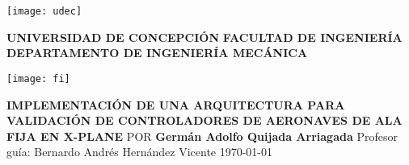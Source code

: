 \begin{titlepage}
    \parbox{1.5cm}{
        \texttt{[image: udec]}
    }
    \hfill
    \parbox[c][2cm]{0.7\textwidth}{
        \centering
        \textbf{UNIVERSIDAD DE CONCEPCIÓN}
        \vfill
        \textbf{FACULTAD DE INGENIERÍA}
        \vfill
        \textbf{DEPARTAMENTO DE INGENIERÍA MECÁNICA}
    }
    \hfill
    \parbox{1.5cm}{
        \texttt{[image: fi]}
    }
    \smallskip
    \vspace*{6cm}
    \centering
    \textbf{IMPLEMENTACIÓN DE UNA ARQUITECTURA PARA VALIDACIÓN DE CONTROLADORES DE AERONAVES DE ALA FIJA EN X-PLANE}
    \bigbreak
    POR
    \bigbreak
    \textbf{Germán Adolfo Quijada Arriagada}
    \vfill
    Profesor guía:
    \smallbreak
    Bernardo Andrés Hernández Vicente
    \vfill
    \today
\end{titlepage}
